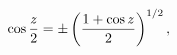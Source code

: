 \[\mathop{\cos\/}\nolimits\frac{z}{2}=\pm\left(\frac{1+\mathop{\cos\/}\nolimits z%
}{2}\right)^{1/2},\]